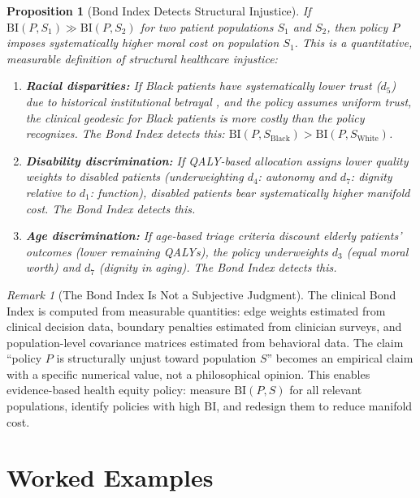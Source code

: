 \documentclass[12pt]{article}
\newtheorem{proposition}[theorem]{Proposition}
\theoremstyle{definition}
\theoremstyle{remark}
\newtheorem{remark}[theorem]{Remark}
\newcommand{\BI}{\mathrm{BI}}              %
\begin{document}
\begin{proposition}[Bond Index Detects Structural Injustice]
\label{prop:structural_injustice}
If $\BI(P, S_1) \gg \BI(P, S_2)$ for two patient populations $S_1$ and $S_2$, then policy $P$ imposes systematically higher moral cost on population $S_1$.  This is a quantitative, measurable definition of structural healthcare injustice:
\begin{enumerate}
    \item \textbf{Racial disparities:} If Black patients have systematically lower trust ($d_5$) due to historical institutional betrayal \cite{washington2006}, and the policy assumes uniform trust, the clinical geodesic for Black patients is more costly than the policy recognizes.  The Bond Index detects this: $\BI(P, S_{\text{Black}}) > \BI(P, S_{\text{White}})$.
    \item \textbf{Disability discrimination:} If QALY-based allocation assigns lower quality weights to disabled patients (underweighting $d_4$: autonomy and $d_7$: dignity relative to $d_1$: function), disabled patients bear systematically higher manifold cost.  The Bond Index detects this.
    \item \textbf{Age discrimination:} If age-based triage criteria discount elderly patients' outcomes (lower remaining QALYs), the policy underweights $d_3$ (equal moral worth) and $d_7$ (dignity in aging).  The Bond Index detects this.
\end{enumerate}
\end{proposition}

\begin{remark}[The Bond Index Is Not a Subjective Judgment]
The clinical Bond Index is computed from measurable quantities: edge weights estimated from clinical decision data, boundary penalties estimated from clinician surveys, and population-level covariance matrices estimated from behavioral data.  The claim ``policy $P$ is structurally unjust toward population $S$'' becomes an empirical claim with a specific numerical value, not a philosophical opinion.  This enables evidence-based health equity policy: measure $\BI(P, S)$ for all relevant populations, identify policies with high $\BI$, and redesign them to reduce manifold cost.
\end{remark}


\section{Worked Examples}
\label{sec:examples}
\end{document}
